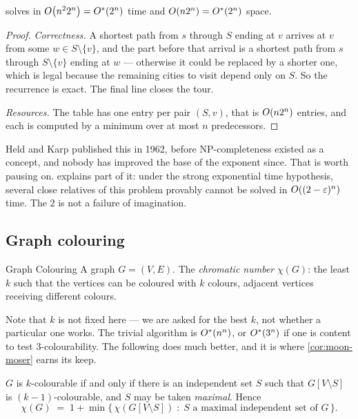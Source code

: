 \begin{theorem}\label{thm:held-karp}
 solves  in $O\!\left(n^2 2^n\right) = O^{*}(2^n)$ time
and $O\!\left(n 2^n\right) = O^{*}(2^n)$ space.
\end{theorem}

\begin{proof}
\emph{Correctness.} A shortest path from $s$ through $S$ ending at $v$ arrives
at $v$ from some $w \in S \setminus \{v\}$, and the part before that arrival is
a shortest path from $s$ through $S \setminus \{v\}$ ending at $w$ --- otherwise
it could be replaced by a shorter one, which is legal because the remaining
cities to visit depend only on $S$. So the recurrence is exact. The final line
closes the tour.

\emph{Resources.} The table has one entry per pair $(S,v)$, that is
$O\!\left(n2^n\right)$ entries, and each is computed by a minimum over at most $n$
predecessors.
\end{proof}

\begin{intuition}
Held and Karp published this in 1962, before \textrm{NP}-completeness existed
as a concept, and nobody has improved the base of the exponent since. That is
worth pausing on.  explains part of it: under the strong
exponential time hypothesis, several close relatives of this problem provably
cannot be solved in $O\!\left((2-\varepsilon)^n\right)$ time. The $2$ is not a failure
of imagination.
\end{intuition}

\subsection{Graph colouring}

\begin{probdef}{Graph Colouring}
  \instance A graph $G = (V,E)$.
  \question The \emph{chromatic number} $\chi(G)$: the least $k$ such that the
  vertices can be coloured with $k$ colours, adjacent vertices receiving
  different colours.
\end{probdef}

Note that $k$ is not fixed here --- we are asked for the best $k$, not whether a
particular one works. The trivial algorithm is $O^{*}(n^n)$, or $O^{*}(3^n)$
if one is content to test $3$-colourability. The following does much better, and
it is where \cref{cor:moon-moser} earns its keep.

\begin{observation}\label{obs:lawler}
$G$ is $k$-colourable if and only if there is an independent set $S$ such that
$G[V \setminus S]$ is $(k-1)$-colourable, and $S$ may be taken \emph{maximal}.
Hence
\[ \chi(G) \;=\; 1 + \min\bigl\{\, \chi(G[V \setminus S]) \;:\;
   S \text{ a maximal independent set of } G \,\bigr\}. \]
\end{observation}

